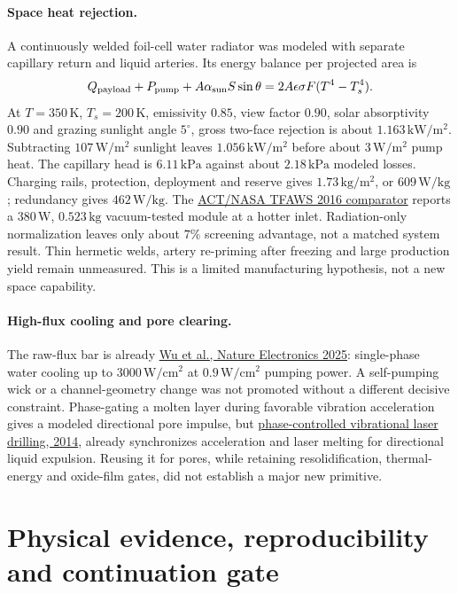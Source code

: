 \documentclass[11pt]{article}
\begin{document}
\paragraph{Space heat rejection.}
A continuously welded foil-cell water radiator was modeled with separate capillary return and liquid arteries. Its energy balance per projected area is
\[
 Q_{\rm payload}+P_{\rm pump}+A\alpha_{\rm sun}S\sin\theta
    =2A\epsilon\sigma F(T^4-T_s^4).
\]
At $T=350\,\mathrm K$, $T_s=200\,\mathrm K$, emissivity $0.85$, view factor $0.90$, solar absorptivity $0.90$ and grazing sunlight angle $5^\circ$, gross two-face rejection is about $1.163\,\mathrm{kW/m^2}$. Subtracting $107\,\mathrm{W/m^2}$ sunlight leaves $1.056\,\mathrm{kW/m^2}$ before about $3\,\mathrm{W/m^2}$ pump heat. The capillary head is $6.11\,\mathrm{kPa}$ against about $2.18\,\mathrm{kPa}$ modeled losses. Charging rails, protection, deployment and reserve gives $1.73\,\mathrm{kg/m^2}$, or $609\,\mathrm{W/kg}$; redundancy gives $462\,\mathrm{W/kg}$. The \href{https://tfaws.nasa.gov/wp-content/uploads/TFAWS2016-HP-05.pdf}{ACT/NASA TFAWS 2016 comparator} reports a $380\,\mathrm W$, $0.523\,\mathrm{kg}$ vacuum-tested module at a hotter inlet. Radiation-only normalization leaves only about $7\%$ screening advantage, not a matched system result. Thin hermetic welds, artery re-priming after freezing and large production yield remain unmeasured. This is a limited manufacturing hypothesis, not a new space capability.

\paragraph{High-flux cooling and pore clearing.}
The raw-flux bar is already \href{https://www.nature.com/articles/s41928-025-01449-4}{Wu et al., Nature Electronics 2025}: single-phase water cooling up to $3000\,\mathrm{W/cm^2}$ at $0.9\,\mathrm{W/cm^2}$ pumping power. A self-pumping wick or a channel-geometry change was not promoted without a different decisive constraint. Phase-gating a molten layer during favorable vibration acceleration gives a modeled directional pore impulse, but \href{https://www.extrica.com/article/14923}{phase-controlled vibrational laser drilling, 2014}, already synchronizes acceleration and laser melting for directional liquid expulsion. Reusing it for pores, while retaining resolidification, thermal-energy and oxide-film gates, did not establish a major new primitive.

\section{Physical evidence, reproducibility and continuation gate}\label{sec:technologyresume}
\end{document}
